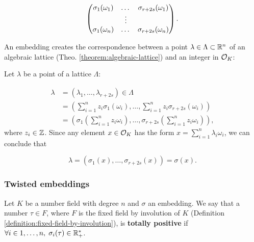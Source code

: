\documentclass[a4paper,12pt]{article}
\begin{document}
\begin{equation}
  \label{definition:gen-matrix-alg-lattices}
  \begin{pmatrix}
    \sigma_1(\omega_1) & $\dots$ &  \sigma_{r+2s}(\omega_1) \\
    & \vdots & \\
    \sigma_1(\omega_n) & $\dots$ & \sigma_{r+2s}(\omega_n) \\
  \end{pmatrix}.  
\end{equation}

\begin{remark}\label{remmark:lattices-number-field-correspondence}
  An embedding creates the correspondence between a point $\lambda \in \Lambda \subset \mathbb{R}^n$ of an algebraic lattice (Theo.
  \ref{theorem:algebraic-lattice}) and an integer in $\mathcal{O}_K$:

  Let $\lambda$ be a point of a lattice $\Lambda$:

\begin{align*} 
     \lambda &= (\lambda_1,\dots,\lambda_{r+2s}) \in \Lambda \\
       &= \left( \sum_{i=1}^n{z_i\sigma_1(\omega_i)} , \dots , \sum_{i=1}^n{z_i\sigma_{r+2s}(\omega_i)} \right) \\
       &= \left( \sigma_1\left(   \sum_{i=1}^n{z_i\omega_i} \right) , \dots , \sigma_{r+2s} \left( \sum_{i=1}^n{z_i\omega_i}  \right) \right), 
\end{align*}
  where $z_i \in \mathbb{Z}$. Since any element $x \in \mathcal{O}_K$ has the form $x =
  \sum_{i=1}^n{\lambda_i\omega_i}$, we can conclude that

  \begin{equation*}
    \lambda = \left( \sigma_1(x), \dots, \sigma_{r+2s}(x) \right) = \sigma(x).
  \end{equation*}

\end{remark}
\subsubsection{Twisted embeddings}
\label{sec:org5516514}

    \begin{definition}
  Let $K$ be a number field with degree $n$ and $\sigma$ an embedding. We say that a
  number $\tau \in F$, where $F$ is the fixed field by involution of $K$ (Definition \ref{definition:fixed-field-by-involution}), is \textbf{totally  positive} if $\forall i \in {1, \dots , n}, \; \sigma_i(\tau) \in \mathbb{R}^*_+$. 
\end{definition}
\end{document}
